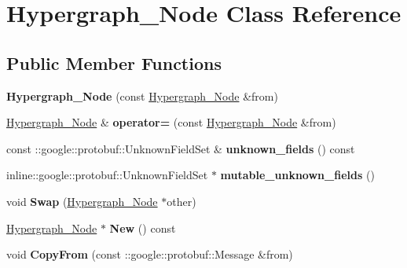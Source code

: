 \hypertarget{classHypergraph__Node}{
\section{Hypergraph\_\-Node Class Reference}
\label{classHypergraph__Node}
}
\subsection*{Public Member Functions}
\begin{DoxyCompactItemize}
\item 
\hypertarget{classHypergraph__Node_a8ff695bda4b12b720c6e45120843afa8}{
{\bfseries Hypergraph\_\-Node} (const \hyperlink{classHypergraph__Node}{Hypergraph\_\-Node} \&from)}
\label{classHypergraph__Node_a8ff695bda4b12b720c6e45120843afa8}

\item 
\hypertarget{classHypergraph__Node_a1c63124309d4c21c6f504de32472e6f4}{
\hyperlink{classHypergraph__Node}{Hypergraph\_\-Node} \& {\bfseries operator=} (const \hyperlink{classHypergraph__Node}{Hypergraph\_\-Node} \&from)}
\label{classHypergraph__Node_a1c63124309d4c21c6f504de32472e6f4}

\item 
\hypertarget{classHypergraph__Node_a5b1f1c8523851547fc23b811b9b3c983}{
const ::google::protobuf::UnknownFieldSet \& {\bfseries unknown\_\-fields} () const }
\label{classHypergraph__Node_a5b1f1c8523851547fc23b811b9b3c983}

\item 
\hypertarget{classHypergraph__Node_ad121adb128167ce797c6dd576956cdc1}{
inline::google::protobuf::UnknownFieldSet $\ast$ {\bfseries mutable\_\-unknown\_\-fields} ()}
\label{classHypergraph__Node_ad121adb128167ce797c6dd576956cdc1}

\item 
\hypertarget{classHypergraph__Node_a2436a5b49db8259590088f9a8024d77b}{
void {\bfseries Swap} (\hyperlink{classHypergraph__Node}{Hypergraph\_\-Node} $\ast$other)}
\label{classHypergraph__Node_a2436a5b49db8259590088f9a8024d77b}

\item 
\hypertarget{classHypergraph__Node_ac5023f5fe7642cd4919282002101b69e}{
\hyperlink{classHypergraph__Node}{Hypergraph\_\-Node} $\ast$ {\bfseries New} () const }
\label{classHypergraph__Node_ac5023f5fe7642cd4919282002101b69e}

\item 
\hypertarget{classHypergraph__Node_aca80a723aabad833f58bce2e69cfa1fc}{
void {\bfseries CopyFrom} (const ::google::protobuf::Message \&from)}
\label{classHypergraph__Node_aca80a723aabad833f58bce2e69cfa1fc}


\end{DoxyCompactItemize}
